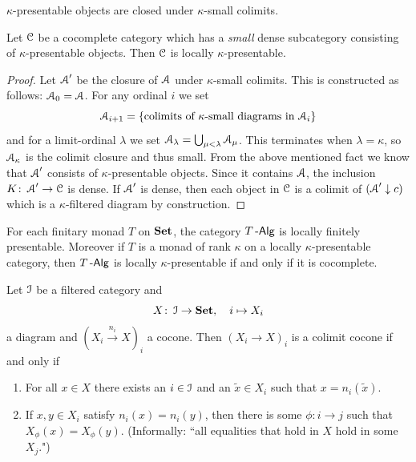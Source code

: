 \documentclass[a4paper,11pt,oneside,openany]{scrbook}
\begin{document}
\begin{center}
	$\kappa$-presentable objects are closed under $\kappa$-small colimits.
\end{center}
\begin{prop}
	Let $\operatorname{\mathcal{C}}$ be a cocomplete category which has a \emph{small} dense subcategory consisting of $\kappa$-presentable objects. Then $\operatorname{\mathcal{C}}$ is locally $\kappa$-presentable.
\end{prop}
\begin{proof}
    Let $\operatorname{\mathcal{A}}'$ be the closure of $\operatorname{\mathcal{A}} $ under $ \kappa $-small  colimits.
    This is constructed as follows: $\operatorname{\mathcal{A}}_0 =\operatorname{\mathcal{A}} $.
    For any ordinal $ i $ we set
    \begin{displaymath}
	\operatorname{\mathcal{A}}_{i+1} = \{\text{colimits of $ \kappa $-small diagrams in $\operatorname{\mathcal{A}}_i $\}}
    \end{displaymath} 
    and for a limit-ordinal $ \lambda $ we set $\operatorname{\mathcal{A}}_\lambda = \bigcup_{\mu<\lambda}\operatorname{\mathcal{A}}_{\mu} $.
    This terminates when $ \lambda = \kappa $, so $\operatorname{\mathcal{A}}_\kappa $ is the colimit closure and thus small.
    From the above mentioned fact we know that $\operatorname{\mathcal{A}}'  $ consists of $ \kappa $-presentable objects.
    Since it contains $\operatorname{\mathcal{A}} $, the inclusion $ K \colon\operatorname{\mathcal{A}}' \to \operatorname{\mathcal{C}} $ is dense.
    If $\operatorname{\mathcal{A}}' $ is dense, then each object in $ \operatorname{\mathcal{C}} $ is a colimit of $(\operatorname{\mathcal{A}}'\downarrow c)$ which is a $ \kappa $-filtered diagram by construction.
\end{proof}
\begin{cor}
    For each finitary monad $ T $ on $ {\normalfont\textbf{Set}} $, the category $ T\operatorname{-\mathsf{Alg}} $ is locally finitely presentable.
    Moreover if $ T $ is a monad of rank $ \kappa $ on a locally $ \kappa $-presentable category, then $ T\operatorname{-\mathsf{Alg}} $ is locally $ \kappa $-presentable if and only if it is cocomplete.
\end{cor}
\begin{thm}
    Let $ \operatorname{\mathcal{I}} $ be a filtered category and
    \begin{displaymath}
        X \colon \operatorname{\mathcal{I}} \to{\normalfont\textbf{Set}},\quad i \mapsto X_i
    \end{displaymath}
    a diagram and $ (X_i \xrightarrow{n_i} X)_i $ a cocone.
    Then $ (X_i \to X)_i $ is a colimit cocone if and only if
    \begin{enumerate}[label=\roman*)]
	\item For all $ x \in X $ there exists an $ i\in\operatorname{\mathcal{I}} $ and an $ \tilde x \in X_i $ such that $ x = n_i (\tilde x) $.
	\item If $ x , y \in X_i $ satisfy $ n_i(x) = n_i(y) $, then there is some $ \phi \colon i\to j $ such that $ X_\phi(x) = X_\phi(y) $.
	    (Informally: ``all equalities that hold in $ X $ hold in some $ X_j $.")
    \end{enumerate}
\end{thm}
\end{document}

